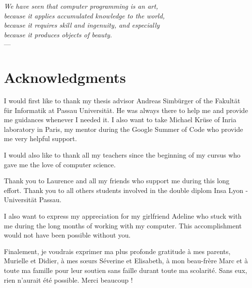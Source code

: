 
\begin{flushright}{\slshape    
    We have seen that computer programming is an art, \\ 
    because it applies accumulated knowledge to the world, \\ 
    because it requires skill and ingenuity, and especially \\
    because it produces objects of beauty.} \\ \medskip
    ---  \citep{knuth:1974}
\end{flushright}



\bigskip

\begingroup
\let\clearpage\relax
\let\cleardoublepage\relax
\let\cleardoublepage\relax
\chapter*{Acknowledgments}
I would first like to thank my thesis advisor Andreas Simbürger of the Fakultät für Informatik at Passau Universität. He was always there to help me and provide me guidances whenever I needed it. 
I also want to take Michael Krüse of Inria laboratory in Paris, my mentor during the Google Summer of Code who provide me very helpful support.

\bigskip

I would also like to thank all my teachers since the beginning of my cursus who gave me the love of computer science.

\bigskip

Thank you to Laurence and all my friends who support me during this long effort.
Thank you to all others students involved in the double diplom Insa Lyon - Universität Passau.

\bigskip

I also want to express my appreciation for my girlfriend Adeline who stuck with me during the long months of working with my computer. This accomplishment would not have been possible without you. 

\bigskip

Finalement, je voudrais exprimer ma plus profonde gratitude à mes parents, Murielle et Didier, à mes sœurs Séverine et Elisabeth, à mon beau-frère Marc et à toute ma famille pour leur soutien sans faille durant toute ma scolarité. Sans eux, rien n'aurait été possible. Merci beaucoup !

\endgroup



